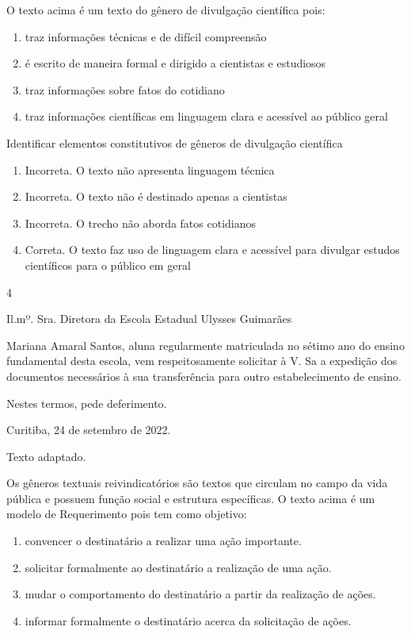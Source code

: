 {{\begin{itemize}
\begin{itemize}
O texto acima é um texto do gênero de divulgação científica pois:

\begin{enumerate}
\def\labelenumi{\alph{enumi})}
\item
  traz informações técnicas e de difícil compreensão
\item
  é escrito de maneira formal e dirigido a cientistas e estudiosos
\item
  traz informações sobre fatos do cotidiano
\item
  traz informações científicas em linguagem clara e acessível ao público
  geral
\end{enumerate}

Identificar elementos constitutivos de gêneros de divulgação científica

\begin{enumerate}
\def\labelenumi{\arabic{enumi}.}
\item
  Incorreta. O texto não apresenta linguagem técnica
\item
  Incorreta. O texto não é destinado apenas a cientistas
\item
  Incorreta. O trecho não aborda fatos cotidianos
\item
  Correta. O texto faz uso de linguagem clara e acessível para divulgar
  estudos científicos para o público em geral
\end{enumerate}

\num{4}

Il.mº. Sra. Diretora da Escola Estadual Ulysses Guimarães

Mariana Amaral Santos, aluna regularmente matriculada no sétimo ano do
ensino fundamental desta escola, vem respeitosamente solicitar à V. Sa a
expedição dos documentos necessários à sua transferência para outro
estabelecimento de ensino.

Nestes termos, pede deferimento.

Curitiba, 24 de setembro de 2022.

Texto adaptado.

Os gêneros textuais reivindicatórios são textos que circulam no campo da
vida pública e possuem função social e estrutura específicas. O texto
acima é um modelo de Requerimento pois tem como objetivo:

\begin{enumerate}
\def\labelenumi{\arabic{enumi}.}
\item
  convencer o destinatário a realizar uma ação importante.
\item
  solicitar formalmente ao destinatário a realização de uma ação.
\item
  mudar o comportamento do destinatário a partir da realização de ações.
\item
  informar formalmente o destinatário acerca da solicitação de ações.
\end{enumerate}


\end{itemize}
\end{itemize}}}
